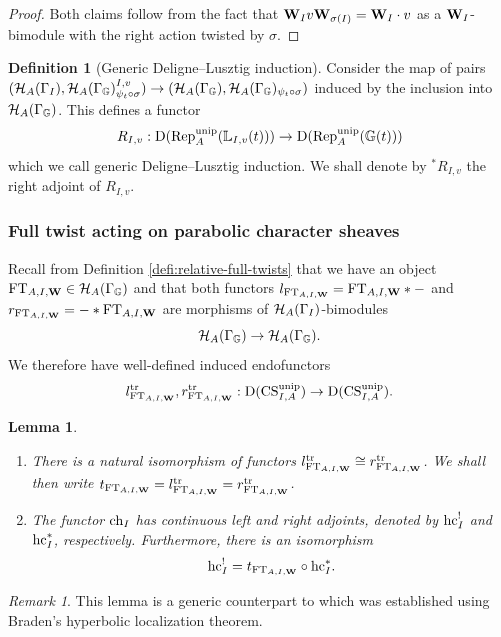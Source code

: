 \documentclass[a4paper, 10pt, oneside, reqno]{amsart}
\theoremstyle{plain}
\newtheorem{lem}[thm]{Lemma}
\theoremstyle{definition}
\newtheorem{defi}[thm]{Definition}
\theoremstyle{remark}
\newtheorem{rque}[thm]{Remark}
\newcommand{\Gbb}{\mathbb{G}}
\newcommand{\FT}{\mathrm{FT}}
\newcommand{\Lbb}{\mathbb{L}}
\begin{document}
\begin{proof}
Both claims follow from the fact that $\mathbf{W}_Iv\mathbf{W}_{\sigma(I)} = \mathbf{W}_I \cdot v$ as a $\mathbf{W}_I$-bimodule with the right action twisted by $\sigma$. 
\end{proof}

\begin{defi}[Generic Deligne--Lusztig induction]
Consider the map of pairs $(\Hcal_A(\Gamma_I), \Hcal_A(\Gamma_{\Gbb})^{I,v}_{\psi_t \circ \sigma}) \to (\Hcal_A(\Gamma_{\Gbb}), \Hcal_A(\Gamma_{\Gbb})_{\psi_t \circ \sigma})$
induced by the inclusion into $\Hcal_A(\Gamma_{\Gbb})$. This defines a functor 
$$R_{I,v} : \DD(\Rep_{A}^{\unip}(\Lbb_{I,v}(t))) \to \DD(\Rep_{A}^{\unip}(\Gbb(t)))$$
which we call generic Deligne--Lusztig induction. We shall denote by ${^*}R_{I,v}$ the right adjoint of $R_{I,v}$.
\end{defi}


\subsubsection{Full twist acting on parabolic character sheaves}

Recall from Definition \ref{defi:relative-full-twists} that we have an object $\FT_{A,I,\Wbf} \in \Hcal_{A}(\Gamma_{\Gbb})$ and that both functors $l_{\FT_{A,I,\Wbf}} = \FT_{A,I,\Wbf} * - $ and $r_{\FT_{A,I,\Wbf}} = - * \FT_{A,I,\Wbf}$ are morphisms of $\mathcal{H}_{A}(\Gamma_I)$-bimodules
$$\Hcal_{A}(\Gamma_{\Gbb}) \to \Hcal_{A}(\Gamma_{\Gbb}).$$ 
We therefore have well-defined induced endofunctors 
$$l^{\tr}_{\FT_{A,I,\Wbf}}, r^{\tr}_{\FT_{A,I,\Wbf}} : \DD(\CS_{I,A}^{\unip}) \to \DD(\CS_{I,A}^{\unip}).$$

\begin{lem}\label{lem:adjoints-to-induction}
\begin{enumerate}
\item There is a natural isomorphism of functors $l^{\tr}_{\FT_{A,I,\Wbf}} \cong r^{\tr}_{\FT_{A,I,\Wbf}}$. We shall then write $t_{\FT_{A,I,\Wbf}} = l^{\tr}_{\FT_{A,I,\Wbf}} =  r^{\tr}_{\FT_{A,I,\Wbf}}$.
\item The functor $\mathrm{ch}_I$ has continuous left and right adjoints, denoted by $\mathrm{hc}_I^!$ and $\mathrm{hc}_I^*$, respectively. Furthermore, there is an isomorphism 
$$\hc_{I}^! = t_{\FT_{A,I,\Wbf}} \circ \hc_I^*.$$
\end{enumerate}
\end{lem}

\begin{rque}
This lemma is a generic counterpart to \cite[Corollary 7.5.10]{GaitsgoryRozemblyumVarshavsky} which was established using Braden's hyperbolic localization theorem. 
\end{rque} 
\end{document}
